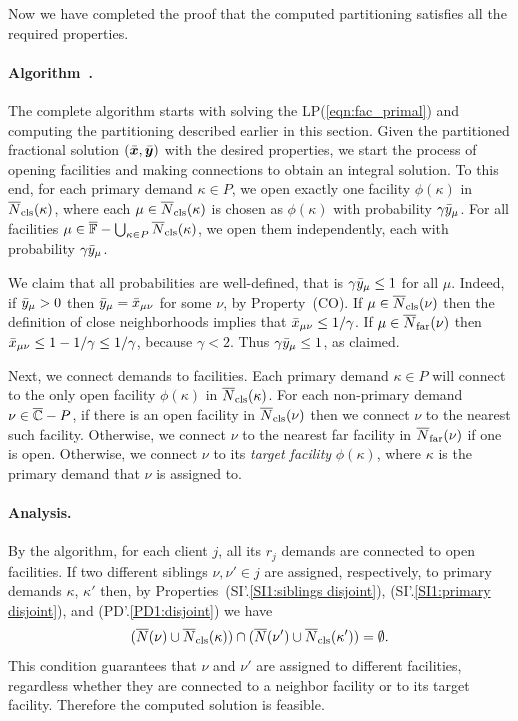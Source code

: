 \documentclass[oneside,final]{ucr}
\begin{document}

Now we have completed the proof that the computed partitioning satisfies
all the required properties. 


\paragraph{Algorithm~{\EBGS}.}
The complete algorithm starts with solving the LP(\ref{eqn:fac_primal}) and
computing the partitioning described earlier in this section.  Given
the partitioned fractional solution $(\bar{\boldsymbol{x}}, \bar{\boldsymbol{y}})$ with the
desired properties, we start the process of opening facilities and
making connections to obtain an integral solution. To this end, for
each primary demand $\kappa\in P$, we open exactly one facility
$\phi(\kappa)$ in ${\overline{N}}_{{\mbox{\scriptsize\rm cls}}}(\kappa)$, where each
$\mu\in{\overline{N}}_{{\mbox{\scriptsize\rm cls}}}(\kappa)$ is chosen as $\phi(\kappa)$ with
probability $\gamma{\bar y}_{\mu}$. For all facilities
$\mu\in\overline{\mathbb{F}} - \bigcup_{\kappa\in P}{\overline{N}}_{{\mbox{\scriptsize\rm cls}}}(\kappa)$, we
open them independently, each with probability
$\gamma{\bar y}_{\mu}$. 

We claim that all probabilities are well-defined, that is
$\gamma{\bar y}_{\mu} \le 1$ for all $\mu$. Indeed, if ${\bar y}_{\mu}>0$ then
${\bar y}_{\mu} = {\bar x}_{\mu\nu}$ for some $\nu$, by Property~(CO).
If $\mu\in {\overline{N}}_{{\mbox{\scriptsize\rm cls}}}(\nu)$ then the definition of close
neighborhoods implies that ${\bar x}_{\mu\nu} \le 1/\gamma$.
If $\mu\in {\overline{N}}_{{\mbox{\scriptsize\rm far}}}(\nu)$ then
${\bar x}_{\mu\nu} \le 1-1/\gamma \le 1/\gamma$, because $\gamma < 2$.
Thus $\gamma{\bar y}_{\mu} \le 1$, as claimed.

Next, we connect demands to facilities.  Each primary demand
$\kappa\in P$ will connect to the only open facility $\phi(\kappa)$ in
${\overline{N}}_{{\mbox{\scriptsize\rm cls}}}(\kappa)$.  For each non-primary demand $\nu\in \overline{\mathbb{C}}
- P$, if there is an open facility in ${\overline{N}}_{{\mbox{\scriptsize\rm cls}}}(\nu)$ then we
connect $\nu$ to the nearest such facility. Otherwise, we connect
$\nu$ to the nearest far facility in ${\overline{N}}_{{\mbox{\scriptsize\rm far}}}(\nu)$ if one is
open. Otherwise, we connect $\nu$ to its \emph{target facility}
$\phi(\kappa)$, where $\kappa$ is the primary demand that $\nu$ is
assigned to.


\paragraph{Analysis.}
By the algorithm, for each client $j$, all its $r_j$ demands are connected to
open facilities. If two different siblings $\nu,\nu'\in j$ are assigned, respectively,
to primary demands $\kappa$, $\kappa'$ then, by
Properties~(SI'.\ref{SI1:siblings disjoint}), (SI'.\ref{SI1:primary
  disjoint}), and (PD'.\ref{PD1:disjoint}) we have
%
\begin{equation*}
( {\overline{N}}(\nu) \cup {\overline{N}}_{{\mbox{\scriptsize\rm cls}}}(\kappa)) \cap ({\overline{N}}(\nu')\cup {\overline{N}}_{{\mbox{\scriptsize\rm cls}}}(\kappa')) = \emptyset.
\end{equation*}
%
This condition guarantees that $\nu$ and $\nu'$ are assigned to different facilities,
regardless whether they are connected to a neighbor facility or to its target facility.
Therefore the computed solution is feasible.
\end{document}
